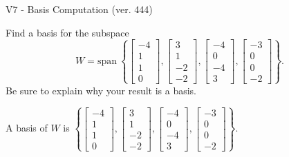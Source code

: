 \begin{exercise}
  \begin{exerciseTitle}V7 - Basis Computation (ver. 444)\end{exerciseTitle}
  \begin{exerciseStatement}
    Find a basis for the subspace 
\[W=\mathrm{span}\ \left\{\left[\begin{array}{r}
-4 \\
1 \\
1 \\
0
\end{array}\right] , \left[\begin{array}{r}
3 \\
1 \\
-2 \\
-2
\end{array}\right] , \left[\begin{array}{r}
-4 \\
0 \\
-4 \\
3
\end{array}\right] , \left[\begin{array}{r}
-3 \\
0 \\
0 \\
-2
\end{array}\right]\right\}.\]
 Be sure to explain why your result is a basis.


  \end{exerciseStatement}
  \begin{exerciseAnswer}
   A basis of \(W\) is  \(\left\{\left[\begin{array}{r}
-4 \\
1 \\
1 \\
0
\end{array}\right] , \left[\begin{array}{r}
3 \\
1 \\
-2 \\
-2
\end{array}\right] , \left[\begin{array}{r}
-4 \\
0 \\
-4 \\
3
\end{array}\right] , \left[\begin{array}{r}
-3 \\
0 \\
0 \\
-2
\end{array}\right]\right\}\).
  


  \end{exerciseAnswer}
\end{exercise}